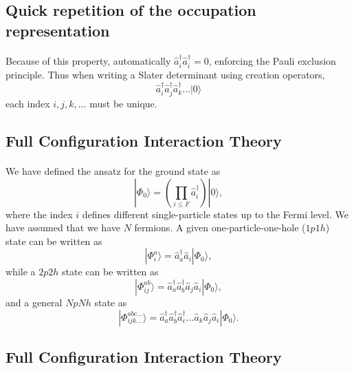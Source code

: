 \documentclass[%
twoside,                 %
final,                   %
10pt]{article}
\begin{document}
\subsection{Quick repetition  of the occupation representation}

\paragraph{}
Because of this property, automatically $\hat{a}^\dagger_i \hat{a}^\dagger_i = 0$, 
enforcing the Pauli exclusion principle.  Thus when writing a Slater determinant 
using creation operators, 
\[
\hat{a}^\dagger_i \hat{a}^\dagger_j \hat{a}^\dagger_k \ldots |0 \rangle
\]
each index $i,j,k, \ldots$ must be unique.




\subsection{Full Configuration Interaction Theory}

\paragraph{}
We have defined the ansatz for the ground state as 
\[
|\Phi_0\rangle = \left(\prod_{i\le F}\hat{a}_{i}^{\dagger}\right)|0\rangle,
\]
where the index $i$ defines different single-particle states up to the Fermi level. We have assumed that we have $N$ fermions. 
A given one-particle-one-hole ($1p1h$) state can be written as
\[
|\Phi_i^a\rangle = \hat{a}_{a}^{\dagger}\hat{a}_i|\Phi_0\rangle,
\]
while a $2p2h$ state can be written as
\[
|\Phi_{ij}^{ab}\rangle = \hat{a}_{a}^{\dagger}\hat{a}_{b}^{\dagger}\hat{a}_j\hat{a}_i|\Phi_0\rangle,
\]
and a general $NpNh$ state as 
\[
|\Phi_{ijk\dots}^{abc\dots}\rangle = \hat{a}_{a}^{\dagger}\hat{a}_{b}^{\dagger}\hat{a}_{c}^{\dagger}\dots\hat{a}_k\hat{a}_j\hat{a}_i|\Phi_0\rangle.
\]



\subsection{Full Configuration Interaction Theory}

\end{document}
